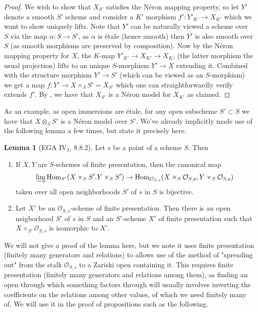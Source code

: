 \documentclass{article}
\theoremstyle{definition}
\newtheorem{lemma}[theorem]{Lemma}
\theoremstyle{remark}
\theoremstyle{plain}
\newcommand{\mc}[1]{\mathcal{#1}}
\begin{document}
\begin{proof}
	We wish to show that $X_{S'}$ satisfies the N\'eron mapping property, so let $Y'$ denote a smooth $S'$ scheme and consider a $K'$ morphism $f': Y'_{K'} \to X_{K'}$ which we want to show uniquely lifts. 
	Note that $Y'$ can be naturally viewed a scheme over $S$ via the map $\alpha: S \to S'$, as $\alpha$ is \'etale (hence smooth) then $Y'$ is also smooth over $S$ (as smooth morphisms are preserved by composition).
	Now by the N\'eron mapping property for $X$, the $K$-map $Y'_{K'} \to X_{K'} \to X_K$, (the latter morphism the usual projection) lifts to an unique $S$-morphism $Y' \to X$ extending it.
	Combined with the structure morphism $Y' \to S'$ (which can be viewed as an $S$-morphism) we get a map $f: Y' \to X \times_{S} S' = X_{S'}$ which one can straightforwardly verify extends $f'$.
	By , we have that $X_{S'}$ is a N\'eron model for $X_{K'}$ as claimed.
	\newline
\end{proof}

As an example, as open immersions are \'etale, for any open subscheme $S' \subset S$ we have that $X \otimes_S S'$ is a N\'eron model over $S'$. 
We've already implicitly made use of the following lemma a few times, but state it precisely here.

\begin{lemma}[EGA $\text{IV}_3$, 8.8.2]\label{EGA-lemma}
	Let $s$ be a point of a scheme $S$. Then
\begin{enumerate}
	\item If $X,Y$ are $S$-schemes of finite presentation, then the canonical map
		\[\varinjlim \text{Hom}_{S'}(X \times_S S'. Y \times_S S') \to \text{Hom}_{\mc{O}_{S,s}}(X \times_S \mc{O}_{S,s}, Y \times_S \mc{O}_{S,s}) \]
	taken over all open neighborhoods $S'$ of $s$ in $S$ is bijective.
\item Let $X'$ be an $\mc{O}_{S,s}$-scheme of finite presentation.
	Then there is an open neigborhood $S'$ of $s$ in $S$ and an $S'$-scheme $X'$ of finite presentation such that $X \times_{S'} \mc{O}_{S,s}$ is isomorphic to $X'$.
\end{enumerate}

\end{lemma}

We will not give a proof of the lemma here, but we note it uses finite presentation (finitely many generators and relations) to allows use of the method of "spreading out" from the stalk $\mc{O}_{S,s}$ to a Zariski open containing it.
This requires finite presentation (finitely many generators and relations among them), as finding an open through which something factors through will usually involves inverting the coefficients on the relations among other values, of which we need finitely many of. 
We will use it in the proof of propositions such as the following.
\end{document}
